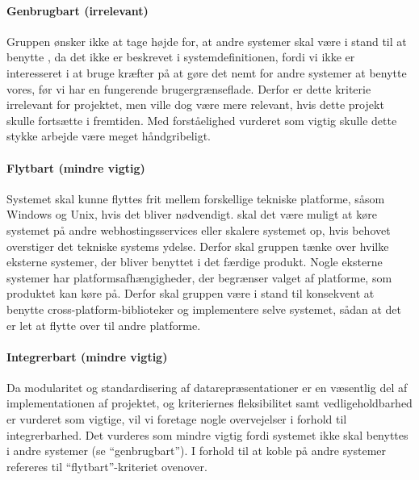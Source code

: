 \paragraph{Genbrugbart (irrelevant)} 
Gruppen ønsker ikke at tage højde for, at andre systemer skal være i stand til at benytte \Foodl{}, da det ikke er beskrevet i systemdefinitionen, fordi vi ikke er interesseret i at bruge kræfter på at gøre det nemt for andre systemer at benytte vores, før vi har en fungerende brugergrænseflade. Derfor er dette kriterie irrelevant for projektet, men ville dog være mere relevant, hvis dette projekt skulle fortsætte i fremtiden. Med forståelighed vurderet som vigtig skulle dette stykke arbejde være meget håndgribeligt.

\paragraph{Flytbart (mindre vigtig)} 
Systemet skal kunne flyttes frit mellem forskellige tekniske platforme, såsom Windows og Unix, hvis det bliver nødvendigt. \Fx skal det være muligt at køre systemet på andre webhostingsservices eller skalere systemet op, hvis behovet overstiger det tekniske systems ydelse. Derfor skal gruppen tænke over hvilke eksterne systemer, der bliver benyttet i det færdige produkt. Nogle eksterne systemer har platformsafhængigheder, der begrænser valget af platforme, som produktet kan køre på. Derfor skal gruppen være i stand til konsekvent at benytte cross-platform-biblioteker og implementere selve systemet, sådan at det er let at flytte over til andre platforme.

\paragraph{Integrerbart (mindre vigtig)} 
Da modularitet og standardisering af datarepræsentationer er en væsentlig del af implementationen af projektet, og kriteriernes fleksibilitet samt vedligeholdbarhed er vurderet som vigtige, vil vi foretage nogle overvejelser i forhold til integrerbarhed. Det vurderes som mindre vigtig fordi systemet ikke skal benyttes i andre systemer (se ``genbrugbart''). I forhold til at koble på andre systemer refereres til ``flytbart''-kriteriet ovenover.
